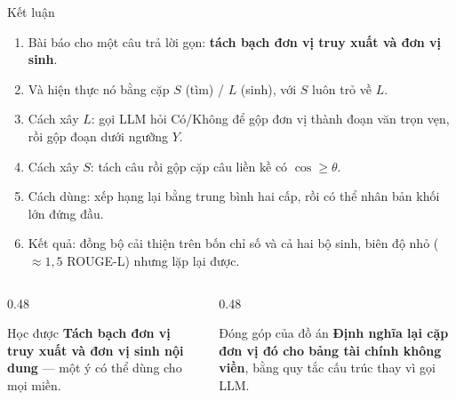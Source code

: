 \documentclass[aspectratio=169,10pt]{beamer}
\begin{document}
\begin{frame}{Kết luận}
  \begin{enumerate}\small
    \item Bài báo cho một câu trả lời gọn: \textbf{tách bạch đơn vị truy xuất và đơn vị sinh}.
    \item Và hiện thực nó bằng cặp $S$ (tìm) / $L$ (sinh), với $S$ luôn trỏ về $L$.
    \item Cách xây $L$: gọi LLM hỏi Có/Không để gộp đơn vị thành đoạn văn trọn vẹn,
          rồi gộp đoạn dưới ngưỡng $Y$.
    \item Cách xây $S$: tách câu rồi gộp cặp câu liền kề có $\cos \ge \theta$.
    \item Cách dùng: xếp hạng lại bằng trung bình hai cấp, rồi có thể nhân bản khối lớn đứng đầu.
    \item Kết quả: đồng bộ cải thiện trên bốn chỉ số và cả hai bộ sinh, biên độ nhỏ
          ($\approx 1{,}5$ ROUGE-L) nhưng lặp lại được.
  \end{enumerate}
  \vspace{0.3em}
  \begin{columns}[T]
    \begin{column}{0.48\textwidth}
      \begin{block}{\small Học được}
        \small \textbf{Tách bạch đơn vị truy xuất và đơn vị sinh nội dung} --- một ý
        có thể dùng cho mọi miền.
      \end{block}
    \end{column}
    \begin{column}{0.48\textwidth}
      \begin{block}{\small Đóng góp của đồ án}
        \small \textbf{Định nghĩa lại cặp đơn vị đó cho bảng tài chính không viền},
        bằng quy tắc cấu trúc thay vì gọi LLM.
      \end{block}
    \end{column}
  \end{columns}
\end{frame}
\end{document}
